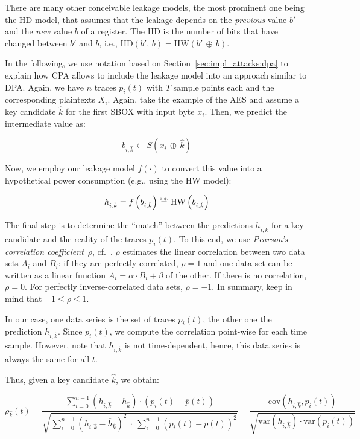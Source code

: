 There are many other conceivable leakage models, the most prominent one being the \ac{HD} model, that assumes that the leakage depends on the \emph{previous} value $b'$ and the \emph{new} value $b$ of a register. The \ac{HD} is the number of bits that have changed between $b'$ and $b$, i.e., $\mbox{HD}\left(b',\,b\right) = \mbox{HW}\left(b'\, \oplus\,b\right)$.

In the following, we use notation based on Section~\ref{sec:impl_attacks:dpa} to explain how \ac{CPA} allows to include the leakage model into an approach similar to \ac{DPA}. Again, we have $n$ traces $p_i \left( t \right)$ with $T$ sample points each and the corresponding plaintexts $X_i$. 
Again, take the example of the \ac{AES} and assume a key candidate $\hat{k}$ for the first \ac{SBOX} with input byte $x_i$. Then, we predict the intermediate value as:

$$
b_{i,\hat{k}} \gets S\left(x_i\,\oplus\,\hat{k}\right)
$$
\vspace{-1mm}

Now, we employ our leakage model $f\left(\cdot\right)$ to convert this value into a hypothetical power consumption (e.g., using the \ac{HW} model): 

$$
h_{i,\hat{k}} = f \left(b_{i,\hat{k}}\right) \stackrel{\mbox{\tiny e.g.}}{=} \mbox{HW}\left( b_{i,\hat{k}}\right)
$$
\vspace{-1mm}

The final step is to determine the ``match'' between the predictions $h_{i,\hat{k}}$ for a key candidate and the reality of the traces $p_i \left( t \right)$. To this end, we use \emph{Pearson's correlation coefficient}~$\rho$, cf.~\cite{wiki:Pearson}. $\rho$ estimates the linear correlation between two data sets $A_i$ and $B_i$: if they are perfectly correlated, $\rho = 1$ and one data set can be written as a linear function $A_i = \alpha \cdot B_i + \beta$ of the other. If there is no correlation, $\rho = 0$. For perfectly inverse-correlated data sets, $\rho = -1$. 
In summary, keep in mind that $-1 \leq \rho \leq 1$.

In our case, one data series is the set of traces $p_i \left( t \right)$, the other one the prediction $h_{i,\hat{k}}$. Since $p_i \left( t \right)$, we compute the correlation point-wise for each time sample. However, note that $h_{i,\hat{k}}$ is not time-dependent, hence, this data series is always the same for all $t$.

Thus, given a key candidate $\hat{k}$, we obtain:

$$
\rho_{\hat{k}}\left(t\right) = \frac{\sum\limits_{i = 0}^{n-1} {\left( h_{i,\hat{k}} - \overline{h}_{\hat{k}}  \right) \cdot \left( p_{i}\left(t\right) - \overline{p}\left(t\right) \right)} }   {\sqrt{\sum\limits_{i = 0}^{n-1} {\left( h_{i,\hat{k}} - \overline{h}_{\hat{k}}\right)^2}\ \cdot \ \sum\limits_{i = 0}^{n-1} {\left( p_{i}\left(t\right) - \overline{p}\left(t\right)\right)^2 }   }} = \frac{\mbox{cov} \left(h_{i,\hat{k}}, p_i\left(t\right)\right)}{\sqrt{\mbox{var}\left(h_{i,\hat{k}}\right) \cdot \mbox{var}\left(p_i\left(t\right)\right)}}
$$

